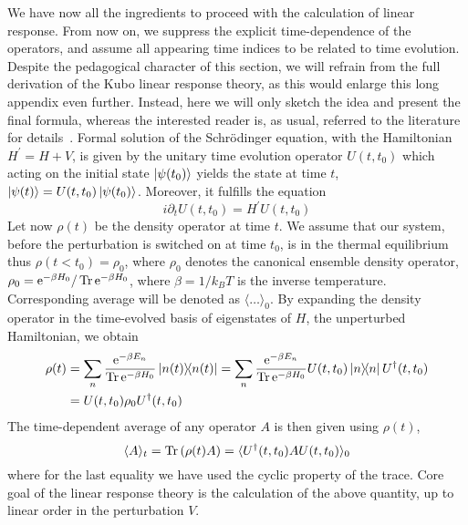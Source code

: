 We have now all the ingredients to proceed with the calculation of linear response.
From now on, we suppress the explicit time-dependence of the operators, and assume all appearing time
indices to be related to time evolution. Despite the pedagogical character of this section, we will
refrain from the full derivation of the Kubo linear response theory, as this would enlarge this long
appendix even further. Instead, here we will only sketch the idea and present the final formula,
whereas the interested reader is, as usual, referred to the literature for details~\autocite{Mahan2000,Pottier2014,Gohmann2021}.
Formal solution of the Schrödinger equation, with the Hamiltonian \(H^{\prime} = H + V\), is given
by the unitary time evolution operator \(U(t,t_{0})\) which acting on the initial state \(\ket{\psi
    (t_{0})}\) yields the state at time \(t\), \(\ket{\psi (t)} = U(t,t_{0}) \ket{\psi (t_{0})}\).
Moreover, it fulfills the equation
\begin{equation}
    i \partial_t U(t,t_{0}) = H^{\prime} U(t,t_{0})
    \label{eq:time_evolution_operator}
\end{equation}
Let now \(\rho (t)\) be the density operator at time \(t\).
We assume that our system, before the perturbation is switched on at time \(t_0\), is in the thermal equilibrium
thus \(\rho (t<t_0 ) = \rho_0\), where \(\rho_0\) denotes the canonical ensemble density operator,
\( \rho_0 = \mathrm{e}^{-\beta H_0} / \Tr \mathrm{e}^{-\beta
    H_0}\), where \(\beta = 1 / k_B T\) is the inverse temperature. Corresponding average will be
denoted as \(\langle \dots  \rangle_0 \). By expanding the density operator in the time-evolved basis
of eigenstates of \(H\), the unperturbed Hamiltonian, we obtain
\begin{align}
    \rho (t) & = \sum_{n} \frac{\mathrm{e}^{-\beta E_n} }{\Tr \mathrm{e}^{-\beta H_0}} \ketbra{n(t)}{n(t)} = \sum_n \frac{\mathrm{e}^{-\beta E_n}}{\Tr \mathrm{e}^{-\beta H_0}} U(t,t_0) \ketbra{n}{n} U^{\dag}(t,t_0)\nonumber \\
             & = U(t,t_0) \rho_0 U^{\dag}(t,t_0)
\end{align}
The time-dependent average of any operator \(A\) is then
given using \(\rho (t)\),
\begin{equation}
    \langle A \rangle_t = \Tr \left( \rho (t) A \right) = \langle U^{\dag}(t,t_0)  A  U(t,t_0)\rangle_0
\end{equation}
where for the last equality we have used the cyclic property of the trace. Core goal of the linear response
theory is the calculation of the above quantity, up to linear order in the perturbation \(V\).
